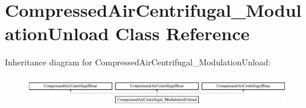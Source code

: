 \hypertarget{class_compressed_air_centrifugal___modulation_unload}{}\section{Compressed\+Air\+Centrifugal\+\_\+\+Modulation\+Unload Class Reference}
\label{class_compressed_air_centrifugal___modulation_unload}
Inheritance diagram for Compressed\+Air\+Centrifugal\+\_\+\+Modulation\+Unload\+:\begin{figure}[H]
\begin{center}
\leavevmode
\includegraphics[height=1.347774cm]{d5/d95/class_compressed_air_centrifugal___modulation_unload}
\end{center}
\end{figure}
